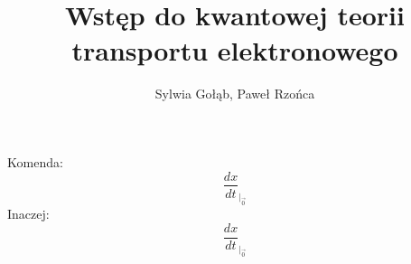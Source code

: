 \documentclass[11pt]{article}
\title{Wstęp do kwantowej teorii transportu elektronowego}
\author{Sylwia Gołąb, Paweł Rzońca}
\newcommand{\wpun}[2]{#1_{\Big|_{#2}}}
\begin{document}
\maketitle

\tableofcontents
\newpage



Komenda:
$$\wpun{\frac{dx}{dt}}{\vec{0}}$$
Inaczej:
$$\frac{dx}{dt}_{\Big|_{\vec{0}}} $$

%
%
%
%
\end{document}
